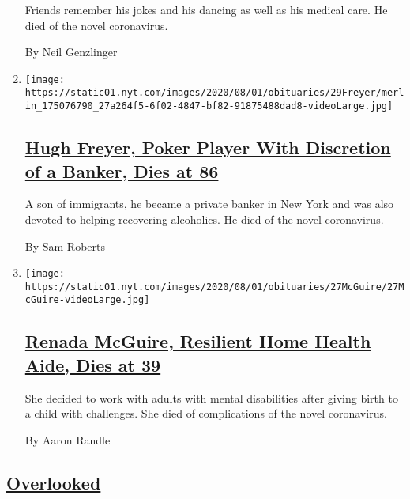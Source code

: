 \begin{enumerate}
  Friends remember his jokes and his dancing as well as his medical
  care. He died of the novel coronavirus.

  By Neil Genzlinger
\item
  \texttt{[image: https://static01.nyt.com/images/2020/08/01/obituaries/29Freyer/merlin\_175076790\_27a264f5-6f02-4847-bf82-91875488dad8-videoLarge.jpg]}

  \hypertarget{hugh-freyer-poker-player-with-discretion-of-a-banker-dies-at-86}{%
  \subsection{\texorpdfstring{\href{/2020/07/30/obituaries/hugh-freyer-dead-coronavirus.html}{Hugh
  Freyer, Poker Player With Discretion of a Banker, Dies at
  86}}{Hugh Freyer, Poker Player With Discretion of a Banker, Dies at 86}}\label{hugh-freyer-poker-player-with-discretion-of-a-banker-dies-at-86}}

  A son of immigrants, he became a private banker in New York and was
  also devoted to helping recovering alcoholics. He died of the novel
  coronavirus.

  By Sam Roberts
\item
  \texttt{[image: https://static01.nyt.com/images/2020/08/01/obituaries/27McGuire/27McGuire-videoLarge.jpg]}

  \hypertarget{renada-mcguire-resilient-home-health-aide-dies-at-39}{%
  \subsection{\texorpdfstring{\href{/2020/07/29/obituaries/renada-mcguire-dead-coronavirus.html}{Renada
  McGuire, Resilient Home Health Aide, Dies at
  39}}{Renada McGuire, Resilient Home Health Aide, Dies at 39}}\label{renada-mcguire-resilient-home-health-aide-dies-at-39}}

  She decided to work with adults with mental disabilities after giving
  birth to a child with challenges. She died of complications of the
  novel coronavirus.

  By Aaron Randle
\end{enumerate}

\hypertarget{overlooked}{%
\subsection{\texorpdfstring{\href{/spotlight/overlooked}{Overlooked}}{Overlooked}}\label{overlooked}}

